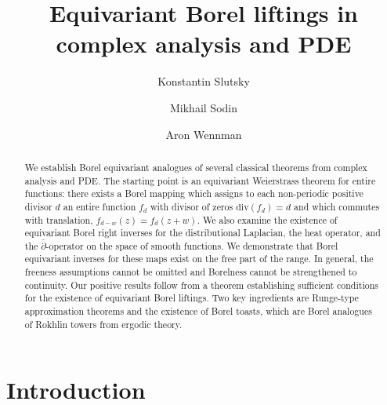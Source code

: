 \documentclass[12pt]{paper}
\numberwithin{equation}{section}
\theoremstyle{plain}
\theoremstyle{definition}
\newcommand{\dm}{\mathrm{div}}      %
\begin{document}
\title{ \vspace{-2.2cm} Equivariant Borel liftings in complex analysis and PDE}

\author{Konstantin Slutsky \and Mikhail Sodin \and Aron Wennman}

\maketitle

\begin{abstract}
  We establish Borel equivariant analogues of several classical theorems from complex analysis and
  PDE.  The starting point is an equivariant Weierstrass theorem for entire functions: there exists
  a Borel mapping which assigns to each non-periodic positive divisor \(d\) an entire function
  \(f_d\) with divisor of zeros \(\dm(f_d)=d\) and which commutes with translation,
  \(f_{d-w}(z)=f_d(z+w)\).  We also examine the existence of equivariant Borel right inverses for
  the distributional Laplacian, the heat operator, and the \(\bar{\partial}\)-operator on the space
  of smooth functions.  We demonstrate that Borel equivariant inverses for these maps exist on the
  free part of the range. In general, the freeness assumptions cannot be
  omitted and Borelness cannot be strengthened to continuity.  Our positive results follow from a
  theorem establishing sufficient conditions for the existence of equivariant Borel liftings.  Two
  key ingredients are Runge-type approximation theorems and the existence of Borel toasts, which are
  Borel analogues of Rokhlin towers from ergodic theory.
\end{abstract}


\tableofcontents


\section{Introduction}
\label{sec:introduction}
\end{document}
